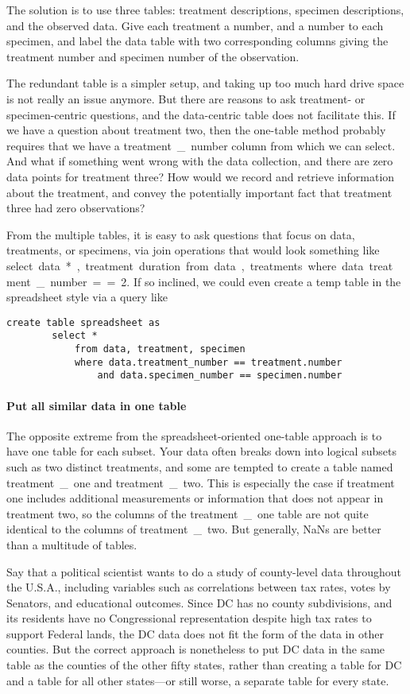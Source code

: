 The solution is to use three tables: treatment descriptions, specimen
descriptions, and the observed data. Give each treatment a number, and a
number to each specimen, and label the data table with two corresponding columns
giving the treatment number and specimen number of the observation.

The redundant table is a simpler setup, and taking up too much hard drive
space is not really an issue anymore. But there are reasons to ask
treatment- or specimen-centric questions, and the data-centric table
does not facilitate this. If we have a question about treatment
two, then the one-table method probably requires that we have a
\si{treatment\_number} column from which we can select. And what if
something went wrong with the data collection, and there are zero data
points for treatment three? How would we record and retrieve information
about the treatment, and convey the potentially important fact that
treatment three had zero observations?

From the multiple tables, it is easy to ask questions that focus on
data, treatments, or specimens, via join operations that would look
something like \si{select data.*, treatment.duration from data, treatments
where data.treat\-ment\_number==2}. If so inclined, we could even create
a temp table in the spreadsheet style via a query like 
\begin{lstlisting}
create table spreadsheet as 
        select * 
            from data, treatment, specimen 
            where data.treatment_number == treatment.number 
                and data.specimen_number == specimen.number
\end{lstlisting}

\paragraph{Put all similar data in one table} The opposite extreme from
the spread\-sheet-oriented one-table approach is to have one table for
each subset. Your data often breaks
down into logical subsets such as two distinct treatments, and 
some are tempted to create a table named \si{treatment\_one} and 
\si{treatment\_two}. This is especially the case if treatment one
includes additional measurements or information that does not appear in
treatment two, so the columns of the \si{treatment\_one} table are not
quite identical to the columns of \si{treatment\_two}. But generally,
\si{NaN}s are better than a multitude of tables.

Say that a political scientist wants to do
a study of county-level data throughout the U.S.A., including variables
such as correlations between tax rates, votes by Senators, and educational
outcomes. Since DC has no county subdivisions, and its residents have no
Congressional representation despite high tax rates to support
Federal lands, the DC data does not fit the form of the data in other
counties. But the correct approach is nonetheless to put DC data in
the same table as the counties of the other fifty states, rather than
creating a table for DC and a table for all other states---or still worse,
a separate table for every state. 

